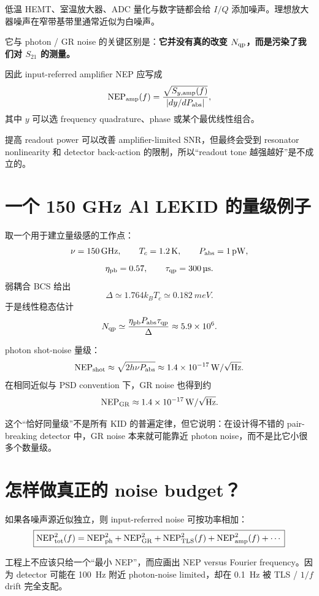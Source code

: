 \documentclass[11pt,a4paper,openany]{ctexrep}
\begin{document}
低温 HEMT、室温放大器、ADC 量化与数字链都会给 $I/Q$ 添加噪声。理想放大器噪声在窄带基带里通常近似为白噪声。

它与 photon / GR noise 的关键区别是：\textbf{它并没有真的改变 $N_{\rm qp}$，而是污染了我们对 $S_{21}$ 的测量。}

因此 input-referred amplifier NEP 应写成
\[
\mathrm{NEP}_{\rm amp}(f)
=
\frac{\sqrt{S_{y,\rm amp}(f)}}
{|dy/dP_{\rm abs}|},
\]
其中 $y$ 可以选 frequency quadrature、phase 或某个最优线性组合。

提高 readout power 可以改善 amplifier-limited SNR，但最终会受到 resonator nonlinearity 和 detector back-action 的限制，所以“readout tone 越强越好”是不成立的。

\section{一个 150 GHz Al LEKID 的量级例子}

取一个用于建立量级感的工作点：
\[
\nu=\SI{150}{GHz},\qquad
T_c=\SI{1.2}{K},\qquad
P_{\rm abs}=\SI{1}{pW},
\]
\[
\eta_{\rm pb}=0.57,\qquad
\tau_{\rm qp}=\SI{300}{\micro s}.
\]
弱耦合 BCS 给出
\[
\Delta\simeq1.764k_BT_c\simeq\SI{0.182}{meV}.
\]
于是线性稳态估计
\[
N_{\rm qp}
\simeq
\frac{\eta_{\rm pb}P_{\rm abs}\tau_{\rm qp}}{\Delta}
\approx 5.9\times10^6.
\]

photon shot-noise 量级：
\[
\mathrm{NEP}_{\rm shot}
\approx
\sqrt{2h\nu P_{\rm abs}}
\approx
1.4\times10^{-17}\,\mathrm{W}/\sqrt{\mathrm{Hz}}.
\]
在相同近似与 PSD convention 下，GR noise 也得到约
\[
\mathrm{NEP}_{\rm GR}
\approx
1.4\times10^{-17}\,\mathrm{W}/\sqrt{\mathrm{Hz}}.
\]

这个“恰好同量级”不是所有 KID 的普遍定律，但它说明：在设计得不错的 pair-breaking detector 中，GR noise 本来就可能靠近 photon noise，而不是比它小很多个数量级。

\section{怎样做真正的 noise budget？}

如果各噪声源近似独立，则 input-referred noise 可按功率相加：
\[
\boxed{
\mathrm{NEP}_{\rm tot}^2(f)
=
\mathrm{NEP}_{\rm ph}^2
+
\mathrm{NEP}_{\rm GR}^2
+
\mathrm{NEP}_{\rm TLS}^2(f)
+
\mathrm{NEP}_{\rm amp}^2(f)
+\cdots
}
\]

工程上不应该只给一个“最小 NEP”，而应画出 NEP versus Fourier frequency。因为 detector 可能在 \SI{100}{Hz} 附近 photon-noise limited，却在 \SI{0.1}{Hz} 被 TLS / $1/f$ drift 完全支配。
\end{document}

